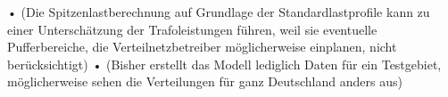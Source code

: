 \documentclass[11pt]{scrreprt}
\begin{document}
•	(Die Spitzenlastberechnung auf Grundlage der Standardlastprofile kann zu einer Unterschätzung der Trafoleistungen führen, weil sie eventuelle Pufferbereiche, die Verteilnetzbetreiber möglicherweise einplanen, nicht berücksichtigt)
•	(Bisher erstellt das Modell lediglich Daten für ein Testgebiet, möglicherweise sehen die Verteilungen für ganz Deutschland anders aus)
\end{document}
